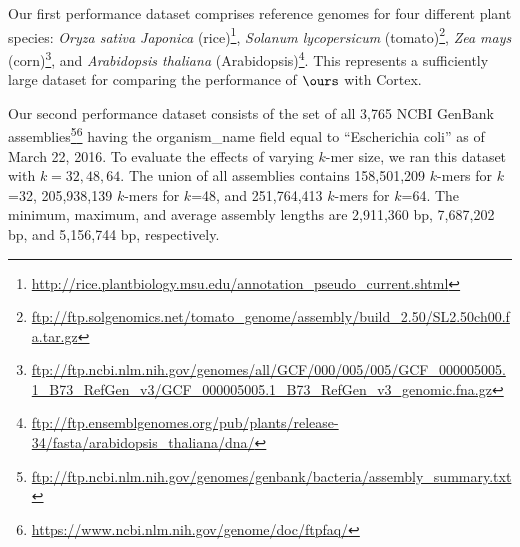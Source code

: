 \begin{table}
\begin{tabularx}{\textwidth}{@{}Yrrrrrrrrr@{}}
    \bottomrule
   \end{tabularx}
      \end{table}





    

    

    Our first performance dataset comprises reference genomes for four different plant species:
    \emph{Oryza sativa Japonica} (rice)\footnote{\url{http://rice.plantbiology.msu.edu/annotation_pseudo_current.shtml}}\citep{rice},
    \emph{Solanum lycopersicum} (tomato)\footnote{\url{ftp://ftp.solgenomics.net/tomato_genome/assembly/build_2.50/SL2.50ch00.fa.tar.gz}}\citep{tomato1,tomato2},
    \emph{Zea mays} (corn)\footnote{\url{ftp://ftp.ncbi.nlm.nih.gov/genomes/all/GCF/000/005/005/GCF_000005005.1_B73_RefGen_v3/GCF_000005005.1_B73_RefGen_v3_genomic.fna.gz}}\citep{corn}, and
    \emph{Arabidopsis thaliana} (Arabidopsis)\footnote{\url{ftp://ftp.ensemblgenomes.org/pub/plants/release-34/fasta/arabidopsis_thaliana/dna/}}\citep{swarbreck}.
    This represents a sufficiently large dataset for comparing the performance of $\ours$ with {\sc Cortex}.  


Our second performance dataset consists of the set of all 3,765  NCBI GenBank assemblies\footnote{\url{ftp://ftp.ncbi.nlm.nih.gov/genomes/genbank/bacteria/assembly_summary.txt}}\footnote{\url{https://www.ncbi.nlm.nih.gov/genome/doc/ftpfaq/}} having the organism\_name field equal to ``Escherichia coli'' as of March 22, 2016.  To evaluate the effects of varying $k$-mer size, we ran this dataset with $k={32,48,64}$.  The union of all assemblies contains 158,501,209 $k$-mers for $k$=32, 205,938,139 $k$-mers for $k$=48, and 251,764,413 $k$-mers for $k$=64.  The minimum, maximum, and average assembly lengths are 2,911,360 bp, 7,687,202 bp, and 5,156,744 bp, respectively.



